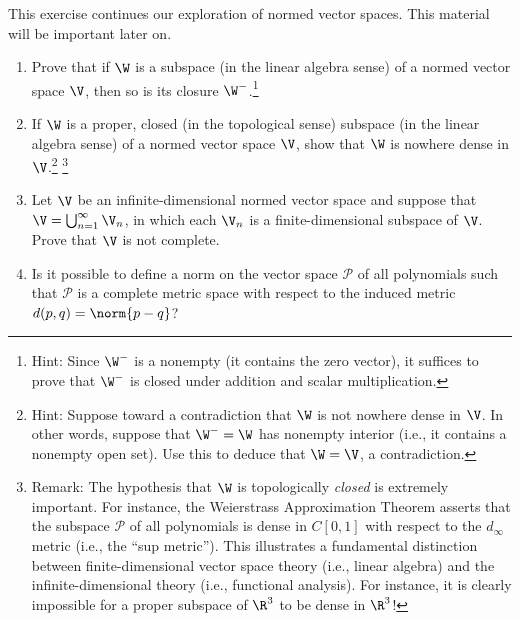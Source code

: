 \documentclass{homework}
\date{Thursday 2/14}
\author{}
\begin{document}
\begin{Exercise}
	This exercise continues our exploration of normed vector spaces.
  This material will be important later on.
	\begin{enumerate}
  \item Prove that if $\W$ is a subspace (in the linear algebra sense)
    of a normed vector space $\V$, then so is its closure
    $\W^- $.\footnote{Hint: Since $\W^- $ is a nonempty (it contains
      the zero vector), it suffices to prove that $\W^- $ is closed
      under addition and scalar multiplication.  }

    \begin{solution}

    \end{solution}

  \item If $\W$ is a proper, closed (in the topological sense)
    subspace (in the linear algebra sense) of a normed vector space
    $\V$, show that $\W$ is nowhere dense in $\V$.\footnote{Hint:
      Suppose toward a contradiction that $\W$ is not nowhere dense in
      $\V$.  In other words, suppose that $\W^- = \W$ has nonempty
      interior (i.e., it contains a nonempty open set).  Use this to
      deduce that $\W = \V$, a contradiction.} \footnote{Remark: The
      hypothesis that $\W$ is topologically \emph{closed} is extremely
      important.  For instance, the Weierstrass Approximation Theorem
      asserts that the subspace $\mathcal{P}$ of all polynomials is
      dense in $C[0,1]$ with respect to the $d_{\infty}$ metric (i.e.,
      the ``sup metric'').  This illustrates a fundamental distinction
      between finite-dimensional vector space theory (i.e., linear
      algebra) and the infinite-dimensional theory (i.e., functional
      analysis).  For instance, it is clearly impossible for a proper
      subspace of $\R^3$ to be dense in $\R^3$!}

    \begin{solution}

    \end{solution}

  \item Let $\V$ be an infinite-dimensional normed vector space and
    suppose that $\V = \bigcup_{n=1}^{\infty} \V_n$, in which each
    $\V_n$ is a finite-dimensional subspace of $\V$.  Prove that $\V$
    is not complete.

    \begin{solution}

    \end{solution}

  \item Is it possible to define a norm on the vector space
    $\mathcal{P}$ of all polynomials such that $\mathcal{P}$ is a
    complete metric space with respect to the induced metric
    $d(p,q) = \norm{p-q}$?

    \begin{solution}

    \end{solution}
	\end{enumerate}
\end{Exercise}
\end{document}
